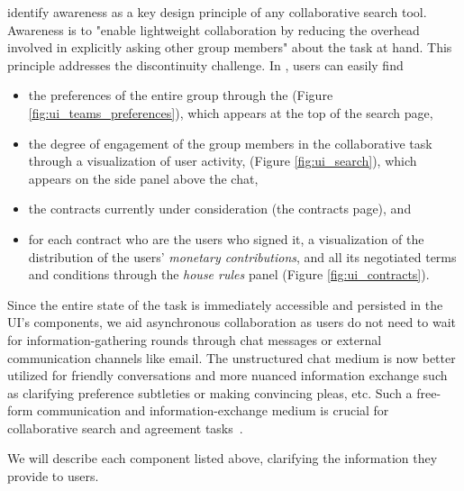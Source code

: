 \pAwareness \citeauthor{searchtogether} identify awareness as a key design principle of any collaborative search tool. Awareness is to "enable lightweight collaboration by reducing the overhead involved in explicitly asking other group members" about the task at hand. This principle addresses the discontinuity challenge. In \tool, users can easily find 
\begin{itemize}
    \item the preferences of the entire group through the \collabQueryPanel (Figure \ref{fig:ui_teams_preferences}), which appears at the top of the search page, 
    \item the degree of engagement of the group members in the collaborative task through a visualization of user activity, \collaboRatio (Figure \ref{fig:ui_search}), which appears on the side panel above the chat, 
    \item the contracts currently under consideration (the contracts page), and 
    \item for each contract who are the users who signed it, a visualization of the distribution of the users' \textit{monetary contributions}, and all its negotiated terms and conditions through the \textit{house rules} panel (Figure \ref{fig:ui_contracts}).
\end{itemize}
Since the entire state of the task is immediately accessible and persisted in the UI's components, we aid asynchronous collaboration as users do not need to wait for information-gathering rounds through chat messages or external communication channels like email. The unstructured chat medium is now better utilized for friendly conversations and more nuanced information exchange such as clarifying preference subtleties or making convincing pleas, etc. Such a free-form communication and information-exchange medium is crucial for collaborative search and agreement tasks~\cite{searchtogether, spliddit, resultsspace}. 

We will describe each component listed above, clarifying the information they provide to users.

